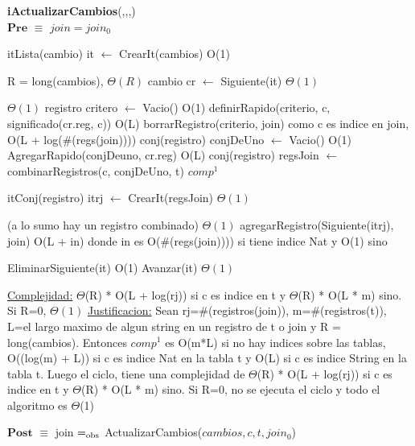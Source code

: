 \begin{algorithm}[H]{\textbf{iActualizarCambios}(,,,) }
		{\\ $\textbf{Pre}$ $\equiv$  $join = join_0$ }
    	\begin{algorithmic}[1]
			\State itLista(cambio) it $\gets$ 	CrearIt(cambios)		\Comment O(1)

			               \Comment R = long(cambios), $\Theta(R)$
			 	\State cambio cr $\gets$ Siguiente(it) \Comment $\Theta(1)$

					 	  \Comment $\Theta(1)$
					 	\State registro critero $\gets$ Vacio() 			\Comment O(1)
					 	\State definirRapido(criterio, c, significado(cr.reg, c))  \Comment O(L)
	   					\State borrarRegistro(criterio, join) \Comment como c es indice en join, O(L + log(\#(regs(join))))
					\Else 
						\State conj(registro) conjDeUno $\gets$ Vacio() 		\Comment O(1)
						\State AgregarRapido(conjDeuno, cr.reg) 			\Comment O(L)
						\State conj(registro) regsJoin $\gets$ combinarRegistros(c, conjDeUno, t)	\Comment $comp^{1}$
						
						\State itConj(registro) itrj $\gets$ CrearIt(regsJoin)        \Comment $\Theta(1)$

						           \Comment (a lo sumo hay un registro combinado) $\Theta(1)$
						 	\State agregarRegistro(Siguiente(itrj), join)	 \Comment O(L + in) donde in es O(\#(regs(join)))) si tiene indice Nat y O(1) sino
						 \EndIf    	    		
    		
	   				\EndIf
	   				
				\State EliminarSiguiente(it)			\Comment O(1)
			 	\State Avanzar(it)                \Comment $\Theta(1)$
			 \EndWhile

			\medskip
			\Statex \underline{Complejidad:} $\Theta$(R) * O(L + log(rj)) si c es indice en t y $\Theta$(R) * O(L * m) sino. Si R=0, $\Theta(1)$
			\Statex \underline{Justificacion:} Sean rj=\#(registros(join)),  m=\#(registros(t)), L=el largo maximo de algun string en un registro de t o join y R = long(cambios).
			\Statex Entonces  $comp^{1}$ es O(m*L) si no hay indices sobre las tablas, O((log(m) + L)) si c es indice Nat en la tabla t y O(L) si c es indice String en la tabla t.
			\Statex Luego el ciclo, tiene una complejidad de $\Theta$(R) * O(L + log(rj)) si c es indice en t y $\Theta$(R) * O(L * m) sino.
			\Statex Si R=0, no se ejecuta el ciclo y todo el algoritmo es $\Theta$(1)
    	\end{algorithmic}
	   {$\textbf{Post}$ $\equiv$  join $=_{\mathrm{obs}}$ ActualizarCambios($cambios, c, t, join_0$)  }    	
\end{algorithm}


